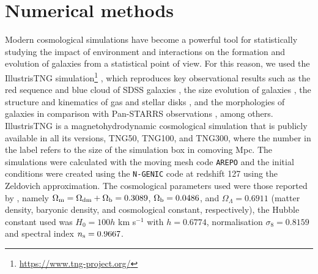 \documentclass[fleqn,usenatbib]{mnras}
\begin{document}
\section{Numerical methods}\label{sec: Methods}
%
Modern cosmological simulations have become a powerful tool for statistically studying the impact of environment and interactions on the formation and evolution of galaxies from a statistical point of view. For this reason, we used the IllustrisTNG simulation\footnote{\url{https://www.tng-project.org/}}  \citep{2018_Marinacci,2018_Naiman,2018_Nelso,2018_Pillepich,2018_Springel}, which reproduces key observational results such as the red sequence and blue cloud of SDSS galaxies \citep{Nelson_2018a}, the size evolution of galaxies \citep{Genel_2017}, the structure and kinematics of gas and stellar disks \citep{Pillepich_2019}, and the morphologies of galaxies in comparison with Pan-STARRS observations \citep{Rodriguez_Gomez_2019}, among others. 
IllustrisTNG is a magnetohydrodynamic cosmological simulation that is publicly available in all its versions, TNG50, TNG100, and TNG300, where the number in the label refers to the size of the simulation box in comoving Mpc. The simulations were calculated with the moving mesh code \texttt{AREPO} \citep{Arepo_2010} and the initial conditions were created using the \texttt{N-GENIC} code \citep{N-genic_2015} at redshift 127 using the Zeldovich approximation. The cosmological parameters used were those reported by \cite{Planck_2016}, namely $\Omega_{\rm m} = \Omega_{\rm dm} + \Omega_{\rm b} = 0.3089$, $\Omega_{\rm b}=0.0486$, and $\Omega_\Lambda = 0.6911$ (matter density, baryonic density, and cosmological constant{, respectively}), the Hubble constant used was $H_0 = 100 h$ km s$^{-1}$ with $h=0.6774$, normalisation $\sigma_8 = 0.8159$ and spectral index $n_{\rm s} = 0.9667$.
\end{document}
